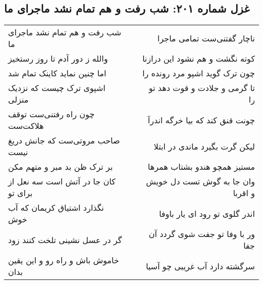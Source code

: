 \begin{center}
\section*{غزل شماره ۲۰۱: شب رفت و هم تمام نشد ماجرای ما}
\label{sec:0201}
\begin{longtable}{l p{0.5cm} r}
شب رفت و هم تمام نشد ماجرای ما
&&
ناچار گفتنی‌ست تمامی ماجرا
\\
والله ز دور آدم تا روز رستخیز
&&
کوته نگشت و هم نشود این درازنا
\\
اما چنین نماید کاینک تمام شد
&&
چون ترک گوید اشپو مرد رونده را
\\
اشپوی ترک چیست که نزدیک منزلی
&&
تا گرمی و جلادت و قوت دهد تو را
\\
چون راه رفتنی‌ست توقف هلاکت‌ست
&&
چونت قنق کند که بیا خرگه اندرآ
\\
صاحب مروتی‌ست که جانش دریغ نیست
&&
لیکن گرت بگیرد ماندی در ابتلا
\\
بر ترک ظن بد مبر و متهم مکن
&&
مستیز همچو هندو بشتاب همرها
\\
کان جا در آتش است سه نعل از برای تو
&&
وان جا به گوش تست دل خویش و اقربا
\\
نگذارد اشتیاق کریمان که آب خوش
&&
اندر گلوی تو رود ای یار باوفا
\\
گر در عسل نشینی تلخت کنند زود
&&
ور با وفا تو جفت شوی گردد آن جفا
\\
خاموش باش و راه رو و این یقین بدان
&&
سرگشته دارد آب غریبی چو آسیا
\\
\end{longtable}
\end{center}

